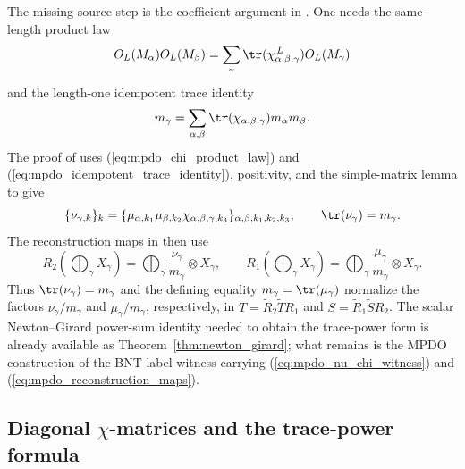 \begin{remark}
    The missing source step is the coefficient argument in
    \cite[Appendix~C.4]{Cirac2016MPDO_arXiv}. One needs the same-length
    product law
    \begin{equation}\label{eq:mpdo_chi_product_law}
        O_L(M_\alpha)O_L(M_\beta)
        =
        \sum_\gamma
        \tr(\chi_{\alpha,\beta,\gamma}^{\,L})
        O_L(M_\gamma)
    \end{equation}
    and the length-one idempotent trace identity
    \begin{equation}\label{eq:mpdo_idempotent_trace_identity}
        m_\gamma
        =
        \sum_{\alpha,\beta}
        \tr(\chi_{\alpha,\beta,\gamma})
        m_\alpha m_\beta.
    \end{equation}
    The proof of \cite[Theorem~4.14]{Cirac2016MPDO_arXiv} uses
    (\ref{eq:mpdo_chi_product_law}) and (\ref{eq:mpdo_idempotent_trace_identity}),
    positivity, and the simple-matrix lemma
    \cite[lines~1155--1163]{Cirac2016MPDO_arXiv} to give
    \begin{equation}\label{eq:mpdo_nu_chi_witness}
        \{\nu_{\gamma,k}\}_k
        =
        \{\mu_{\alpha,k_1}\mu_{\beta,k_2}
        \chi_{\alpha,\beta,\gamma,k_3}\}_{\alpha,\beta,k_1,k_2,k_3},
        \qquad
        \tr(\nu_\gamma)=m_\gamma.
    \end{equation}
    The reconstruction maps in \cite[lines~2065--2085]{Cirac2016MPDO_arXiv}
    then use
    \begin{equation}\label{eq:mpdo_reconstruction_maps}
        \widetilde R_2\left(\bigoplus_\gamma X_\gamma\right)
        = \bigoplus_\gamma \frac{\nu_\gamma}{m_\gamma}\otimes X_\gamma,
        \qquad
        \widetilde R_1\left(\bigoplus_\gamma X_\gamma\right)
        = \bigoplus_\gamma \frac{\mu_\gamma}{m_\gamma}\otimes X_\gamma.
    \end{equation}
    Thus $\tr(\nu_\gamma)=m_\gamma$ and the defining equality
    $m_\gamma=\tr(\mu_\gamma)$ normalize the factors
    $\nu_\gamma/m_\gamma$ and $\mu_\gamma/m_\gamma$, respectively, in
    $T=\widetilde R_2\widetilde T R_1$ and
    $S=\widetilde R_1\widetilde S R_2$. The scalar
    Newton--Girard power-sum identity needed to obtain the trace-power form is
    already available as
    Theorem~\ref{thm:newton_girard}; what remains is the MPDO construction of
    the BNT-label witness carrying (\ref{eq:mpdo_nu_chi_witness}) and
    (\ref{eq:mpdo_reconstruction_maps}).
\end{remark}

\subsection{Diagonal \texorpdfstring{$\chi$}{chi}-matrices and the trace-power formula}

